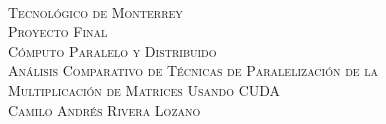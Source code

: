 \begin{titlepage} 
	\begin{center}
		~\\[4cm]
		\textsc{\LARGE Tecnológico de Monterrey}\\[3cm]
		\textsc{\Large Proyecto Final}\\[1.5cm]
		\textsc{\Large Cómputo Paralelo y Distribuido}\\[3cm]
		
		\textsc{\Large Análisis Comparativo de Técnicas de Paralelización de la}\\[0.3cm]
		\textsc{\Large Multiplicación de Matrices Usando CUDA}\\[3cm]
		
		\textsc{\large Camilo Andrés Rivera Lozano}\\[3cm]
		
		\large\DayAfter[2]
	\end{center} 
\end{titlepage}